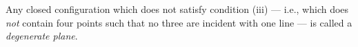 Any closed configuration which does not satisfy condition (iii) — i.e., which does \textit{not} contain four points such that no three are incident with one line — is called a \textit{degenerate plane}.
